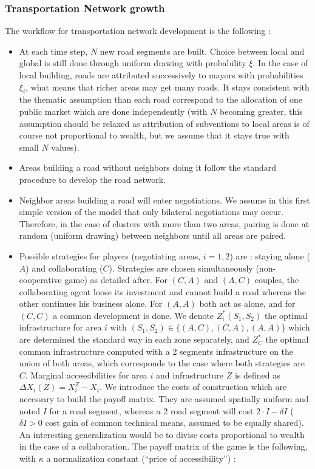 \subsubsection{Transportation Network growth}


The workflow for transportation network development is the following :

\begin{itemize}

\item At each time step, $N$ new road segments are built. Choice between local and global is still done through uniform drawing with probability $\xi$. In the case of local building, roads are attributed successively to mayors with probabilities $\xi_i$, what means that richer areas may get many roads. It stays consistent with the thematic assumption than each road correspond to the allocation of one public market which are done independently (with $N$ becoming greater, this assumption should be relaxed as attribution of subventions to local areas is of course not proportional to wealth, but we assume that it stays true with small $N$ values). 

\item Areas building a road without neighbors doing it follow the standard procedure to develop the road network.

\item Neighbor areas building a road will enter negotiations. We assume in this first simple version of the model that only bilateral negotiations may occur. Therefore, in the case of clusters with more than two areas, pairing is done at random (uniform drawing) between neighbors until all areas are paired.

\item Possible strategies for players (negotiating areas, $i=1,2$) are : staying alone ($A$) and collaborating ($C$). Strategies are chosen simultaneously (non-cooperative game) as detailed after. For $(C,A)$ and $(A,C)$ couples, the collaborating agent loose its investment and cannot build a road whereas the other continues his business alone. For $(A,A)$ both act as alone, and for $(C,C)$ a common development is done. We denote $Z^{\ast}_i(S_1,S_2)$ the optimal infrastructure for area $i$ with $(S_1,S_2)\in \{(A,C),(C,A),(A,A)\}$ which are determined the standard way in each zone separately, and $Z^{\ast}_C$ the optimal common infrastructure computed with a 2 segments infrastructure on the union of both areas, which corresponds to the case where both strategies are $C$. Marginal accessibilities for area $i$ and infrastructure $Z$ is defined as $\Delta X_i(Z)=X^Z_i - X_i$. We introduce the costs of construction which are necessary to build the payoff matrix. They are assumed spatially uniform and noted $I$ for a road segment, whereas a 2 road segment will cost $2\cdot I - \delta I$ ($\delta I > 0$ cost gain of common technical means, assumed to be equally shared). An interesting generalization would be to divise costs proportional to wealth in the case of a collaboration. The payoff matrix of the game is the following, with $\kappa$ a normalization constant (``price of accessibility'') :


\end{itemize}
